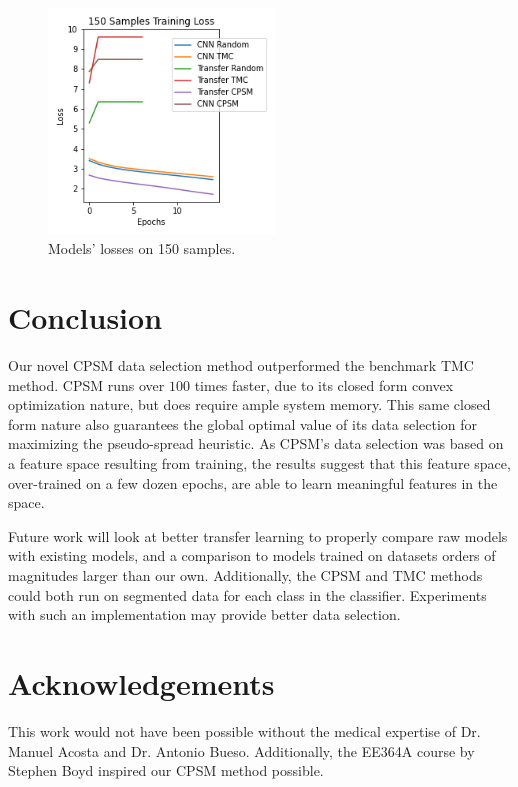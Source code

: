 \documentclass[10pt,twocolumn,letterpaper]{article}
\begin{document}
\begin{figure}[!htb]
    \centering

    \includegraphics[width=6cm]{latex/figs/150_Losses(1).png}
    \caption{Models' losses on 150 samples.}
    \label{fig:data_selection_150}
\end{figure}

\section{Conclusion}

Our novel CPSM data selection method outperformed the benchmark TMC method. CPSM runs over $100$ times faster, due to its closed form convex optimization nature, but does require ample system memory. This same closed form nature also guarantees the global optimal value of its data selection for maximizing the pseudo-spread heuristic. As CPSM's data selection was based on a feature space resulting from training, the results suggest that this feature space, over-trained on a few dozen epochs, are able to learn meaningful features in the space.

Future work will look at better transfer learning to properly compare raw models with existing models, and a comparison to models trained on datasets orders of magnitudes larger than our own. Additionally, the CPSM and TMC methods could both run on segmented data for each class in the classifier. Experiments with such an implementation may provide better data selection.

\section{Acknowledgements}
This work would not have been possible without the medical expertise of Dr. Manuel Acosta and Dr. Antonio Bueso. Additionally, the EE364A course by Stephen Boyd inspired our CPSM method possible.

{\small


}
\newpage
\end{document}
